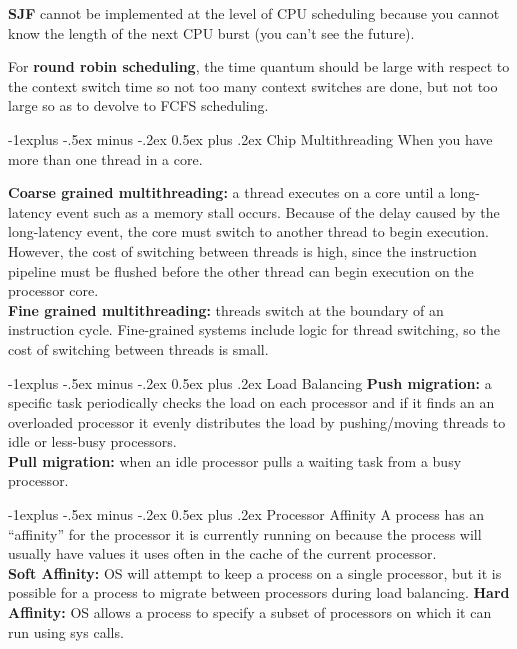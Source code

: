 \documentclass[letterpaper, 8pt]{extarticle}
\makeatletter
\renewcommand{\subsection}{\@startsection{subsection}{2}{0mm}%
                                {-1explus -.5ex minus -.2ex}%
                                {0.5ex plus .2ex}%
                                {\normalfont\small\bfseries}}
\makeatother
\begin{document}
\begin{multicols*}{6}
    \textbf{SJF} cannot be implemented at the level of CPU scheduling because
    you cannot know the length of the next CPU burst (you can't see the future).

    For \textbf{round robin scheduling}, the time quantum should be large
    with respect to the context switch time so not too many context switches
    are done, but not too large so as to devolve to FCFS scheduling.

    \subsection{Chip Multithreading}
    When you have more than one thread in a core.

    \textbf{Coarse grained multithreading:} a thread executes on a core until a
    long-latency event such as a memory stall occurs. Because of the delay
    caused by the long-latency event, the core must switch to another thread to
    begin execution. However, the cost of switching between threads is high,
    since the instruction pipeline must be flushed before the other thread can
    begin execution on the processor core.\\
    \textbf{Fine grained multithreading:} threads switch at the boundary of
    an instruction cycle. Fine-grained systems include logic
    for thread switching, so the cost of switching between threads is small.

    \subsection{Load Balancing}
    \textbf{Push migration:} a specific task periodically checks the
    load on each processor and if it finds an an overloaded processor it
    evenly distributes the load by pushing/moving threads to idle or less-busy
    processors.\\
    \textbf{Pull migration:} when an idle processor pulls a waiting task
    from a busy processor.

    \subsection{Processor Affinity}
    A process has an ``affinity'' for the processor it is currently
    running on because the process will usually have values it uses often
    in the cache of the current processor.\\
    \textbf{Soft Affinity:} OS will attempt to keep a process on a single
    processor, but it is possible for a process to migrate
    between processors during load balancing.
    \textbf{Hard Affinity:} OS allows a process to specify a subset of
    processors on which it can run using sys calls.


\end{multicols*}
\end{document}
